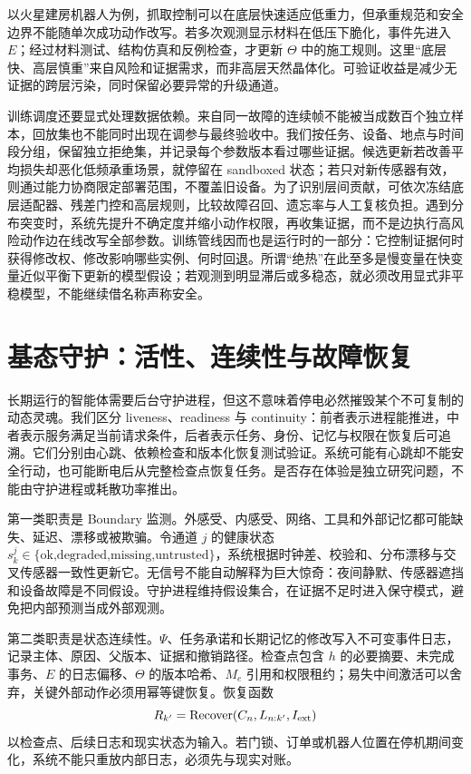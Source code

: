 以火星建房机器人为例，抓取控制可以在底层快速适应低重力，但承重规范和安全边界不能随单次成功动作改写。若多次观测显示材料在低压下脆化，事件先进入 $E$；经过材料测试、结构仿真和反例检查，才更新 $\Theta$ 中的施工规则。这里“底层快、高层慎重”来自风险和证据需求，而非高层天然晶体化。可验证收益是减少无证据的跨层污染，同时保留必要异常的升级通道。

训练调度还要显式处理数据依赖。来自同一故障的连续帧不能被当成数百个独立样本，回放集也不能同时出现在调参与最终验收中。我们按任务、设备、地点与时间段分组，保留独立拒绝集，并记录每个参数版本看过哪些证据。候选更新若改善平均损失却恶化低频承重场景，就停留在 sandboxed 状态；若只对新传感器有效，则通过能力协商限定部署范围，不覆盖旧设备。为了识别层间贡献，可依次冻结底层适配器、残差门控和高层规则，比较故障召回、遗忘率与人工复核负担。遇到分布突变时，系统先提升不确定度并缩小动作权限，再收集证据，而不是边执行高风险动作边在线改写全部参数。训练管线因而也是运行时的一部分：它控制证据何时获得修改权、修改影响哪些实例、何时回退。所谓“绝热”在此至多是慢变量在快变量近似平衡下更新的模型假设；若观测到明显滞后或多稳态，就必须改用显式非平稳模型，不能继续借名称声称安全。

\section{基态守护：活性、连续性与故障恢复}
\label{sec:basal_metabolic_daemon}

长期运行的智能体需要后台守护进程，但这不意味着停电必然摧毁某个不可复制的动态灵魂。我们区分 liveness、readiness 与 continuity：前者表示进程能推进，中者表示服务满足当前请求条件，后者表示任务、身份、记忆与权限在恢复后可追溯。它们分别由心跳、依赖检查和版本化恢复测试验证。系统可能有心跳却不能安全行动，也可能断电后从完整检查点恢复任务。是否存在体验是独立研究问题，不能由守护进程或耗散功率推出。

第一类职责是 Boundary 监测。外感受、内感受、网络、工具和外部记忆都可能缺失、延迟、漂移或被欺骗。令通道 $j$ 的健康状态 $s^j_k\in\{\text{ok,degraded,missing,untrusted}\}$，系统根据时钟差、校验和、分布漂移与交叉传感器一致性更新它。无信号不能自动解释为巨大惊奇：夜间静默、传感器遮挡和设备故障是不同假设。守护进程维持假设集合，在证据不足时进入保守模式，避免把内部预测当成外部观测。

第二类职责是状态连续性。$\Psi$、任务承诺和长期记忆的修改写入不可变事件日志，记录主体、原因、父版本、证据和撤销路径。检查点包含 $h$ 的必要摘要、未完成事务、$E$ 的日志偏移、$\Theta$ 的版本哈希、$M_e$ 引用和权限租约；易失中间激活可以舍弃，关键外部动作必须用幂等键恢复。恢复函数
\[
R_{k'}=\operatorname{Recover}(C_n,L_{n:k'},I_{\rm ext})
\]
以检查点、后续日志和现实状态为输入。若门锁、订单或机器人位置在停机期间变化，系统不能只重放内部日志，必须先与现实对账。

